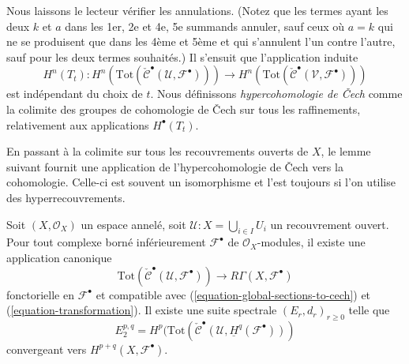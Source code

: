 Nous laissons le lecteur vérifier les annulations. (Notez que les termes ayant les deux $k$ et $a$ dans les 1er, 2e et 4e, 5e summands annuler, sauf ceux où $a = k$ qui ne se produisent que dans les 4ème et 5ème et qui s'annulent l'un contre l'autre, sauf pour les deux termes souhaités.) Il s'ensuit que l'application induite
$$
H^n(T_t) :
H^n(
\text{Tot}(\check{\mathcal{C}}^\bullet({\mathcal U}, {\mathcal F}^\bullet))
)
\to
H^n(
\text{Tot}(\check{\mathcal{C}}^\bullet({\mathcal V}, {\mathcal F}^\bullet))
)
$$
est indépendant du choix de $t$. Nous définissons
{\it hypercohomologie de {\v C}ech} comme la colimite des groupes de cohomologie de {\v C}ech sur tous les raffinements, relativement aux applications $H^\bullet(T_t)$.

\medskip\noindent
En passant à la colimite sur tous les recouvrements ouverts de $X$, le lemme suivant fournit une application de l'hypercohomologie de {\v C}ech vers la cohomologie. Celle-ci est souvent un isomorphisme et l'est toujours si l'on utilise des hyperrecouvrements.

\begin{lemma}

\label{lemma-cech-complex-complex}
Soit $(X, \mathcal{O}_X)$ un espace annelé, soit $\mathcal{U} : X = \bigcup_{i \in I} U_i$ un recouvrement ouvert. Pour tout complexe borné inférieurement $\mathcal{F}^\bullet$ de $\mathcal{O}_X$-modules, il existe une application canonique $$
\text{Tot}(\check{\mathcal{C}}^\bullet(\mathcal{U}, \mathcal{F}^\bullet))
\longrightarrow
R\Gamma(X, \mathcal{F}^\bullet)
$$ fonctorielle en $\mathcal{F}^\bullet$ et compatible avec (\ref{equation-global-sections-to-cech}) et (\ref{equation-transformation}). Il existe une suite spectrale $(E_r, d_r)_{r \geq 0}$ telle que $$
E_2^{p, q} =
H^p(\text{Tot}(\check{\mathcal{C}}^\bullet(\mathcal{U},
\underline{H}^q(\mathcal{F}^\bullet)))
$$ convergeant vers $H^{p + q}(X, \mathcal{F}^\bullet)$.
\end{lemma}


